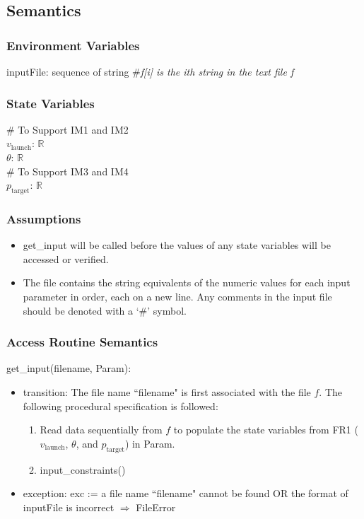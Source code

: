 \documentclass[12pt, titlepage]{article}
\begin{document}
\subsection{Semantics}

\subsubsection{Environment Variables}

inputFile: sequence of string \#\textit{f[i] is the ith string in the text file f}

\subsubsection{State Variables}

\# To Support IM1 and IM2 \\
$v_{\text{launch}}$: $\mathbb{R}$\\
$\theta$: $\mathbb{R}$\\
\# To Support IM3 and IM4 \\
$p_{\text{target}}$: $\mathbb{R}$\\

\subsubsection{Assumptions}

\begin{itemize}

\item get\_input will be called before the values of any state variables will 
be accessed or verified.

\item The file contains the string equivalents of the numeric values for
each input parameter in order, each on a new line. Any comments in the input file 
should be denoted with a `\#' symbol.

\end{itemize}

\subsubsection{Access Routine Semantics}

\noindent get\_input(filename, Param):
\begin{itemize}
\item transition: The file name ``filename" is first associated with the file $f$. 
The following procedural specification is followed:
\begin{enumerate}
\item Read data sequentially from $f$ to populate the state variables from
FR1 ($v_{\text{launch}}$, $\theta$, and $p_{\text{target}}$) in Param.
\item input\_constraints()
\end{enumerate}

\item exception: exc := a file name ``filename" cannot be found OR the format of
inputFile is incorrect $\Rightarrow$  FileError
\end{itemize}
\end{document}

